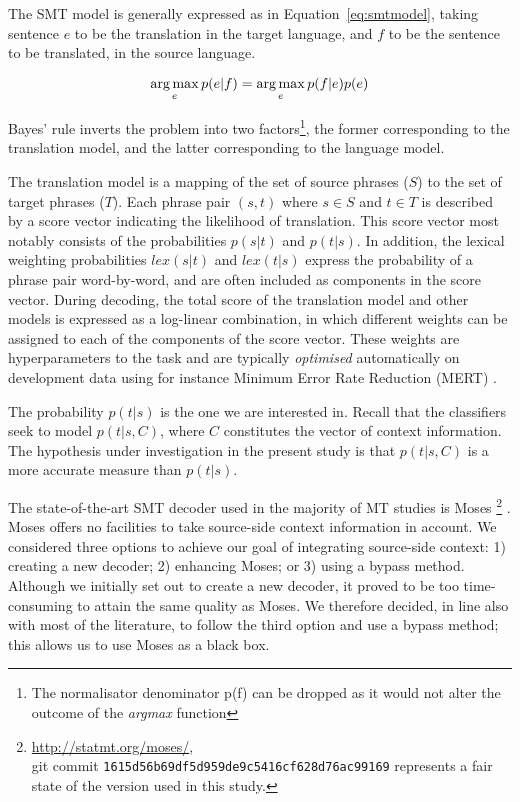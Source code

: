The SMT model is generally expressed as in Equation~\ref{eq:smtmodel}, taking
sentence $e$ to be the translation in the target language, and $f$ to be the sentence to be
translated, in the source language.

\begin{equation}
\operatorname*{arg\,max}_e p(e|f) = \operatorname*{arg\,max}_e p(f|e)p(e)
\label{eq:smtmodel}
\end{equation}

Bayes' rule inverts the problem into two factors\footnote{The normalisator
denominator p(f) can be dropped as it would not alter the outcome of the
\emph{argmax} function}, the former corresponding to the translation model, and
the latter corresponding to the language model. 

The translation model is a mapping of the set of source phrases ($S$) to the
set of target phrases ($T$). Each phrase pair $(s,t)$ where $s \in S$ and $t
\in T$ is described by a score vector indicating the likelihood of
translation. This score vector most notably consists of the probabilities
$p(s|t)$ and $p(t|s)$. In addition, the lexical weighting probabilities $lex(s|t)$
and $lex(t|s)$ express the probability of a phrase pair word-by-word, and are
often included as components in the score vector. During decoding, the total
score of the translation model and other models is expressed as a log-linear
combination, in which different weights can be assigned to each of the
components of the score vector. These weights are hyperparameters to the task and
are typically \emph{optimised} automatically on development data using for instance
Minimum Error Rate Reduction (MERT) \citep{MERT}.

The probability $p(t|s)$ is the one we are interested in. Recall that the
classifiers seek to model $p(t|s,C)$, where $C$ constitutes the vector of
context information. The hypothesis under investigation in the present study is
that $p(t|s,C)$ is a more accurate measure than $p(t|s)$.

The state-of-the-art SMT decoder used in the majority of MT studies is Moses
\footnote{\url{http://statmt.org/moses/}, \\ git commit
\texttt{1615d56b69df5d959de9c5416cf628d76ac99169} represents a fair state of the
version used in this study.} \citep{MOSES}. Moses offers no facilities to take
source-side context information in account. We considered three options to
achieve our goal of integrating source-side context: 1) creating a new decoder;
2) enhancing Moses; or 3) using a bypass method. Although we initially set out
to create a new decoder, it proved to be too time-consuming to attain the same
quality as Moses.  We therefore decided, in line also with most of the
literature, to follow the third option and use a bypass method; this allows us
to use Moses as a black box.

